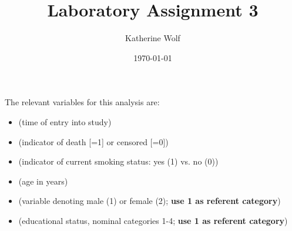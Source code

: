 \documentclass{article}\usepackage[]{graphicx}\usepackage[]{color}
\title{Laboratory Assignment 3}
\author{Katherine Wolf}
\date{\today}
\newif\ifdraft  %
\begin{document}
  \vspace*{-2cm}
  {\let\newpage\relax\maketitle}
  
\maketitle

\ifdraft

\textbf{Read all questions carefully before answering.} You may work in small groups of no more than 3 individuals and turn in a single assignment (and everyone in the group will receive the same grade). Work through the entire assignment individually first, then come together to discuss and collaborate. Please type your responses, \textbf{show your work, and please keep answers brief}.

\section*{Directions}

\vspace{2mm}

Use the dataset \codeword{frmgham_recoded.Rdata} and code provided herein to explore the relationship between smoking status at baseline and time to death in the Framingham cohort.

\fi



\ifdraft

\vspace{2mm}

The relevant variables for this analysis are:
\begin{itemize}
  \item {} (time of entry into study)
  \item {} (indicator of death [=1] or censored [=0])
  \item {} (indicator of current smoking status: yes (1) vs. no (0))
  \item {} (age in years)
  \item {} (variable denoting male (1) or female (2); \textbf{use 1 as referent category})
  \item {} (educational status, nominal categories 1-4; \textbf{use 1 as referent category})
\end{itemize}
\end{document}
